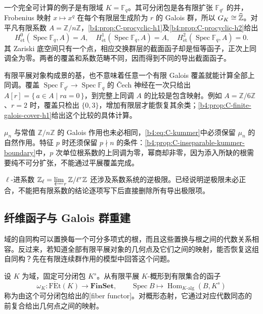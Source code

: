 一个完全可计算的例子是有限域 \(K=\mathbb F_q\)。其可分闭包是各有限扩张 \(\mathbb F_{q^r}\) 的并，Frobenius 映射 \(x\mapsto x^q\) 在每个有限层生成阶为 \(r\) 的 Galois 群，所以 \(G_K\cong\widehat{\vphantom{Z}\mathbb Z}\)。对平凡有限系数 \(A=\mathbb Z/n\mathbb Z\)，\cref{b4:prop:C-procyclic-h1}及\cref{b4:prop:C-procyclic-h2}给出
\[
	H^0_{\mathrm{\acute et}}(\operatorname{Spec}\mathbb F_q,A)=A, \quad H^1_{\mathrm{\acute et}}(\operatorname{Spec}\mathbb F_q,A)=A, \quad H^2_{\mathrm{\acute et}}(\operatorname{Spec}\mathbb F_q,A)=0.
\]
其 Zariski 底空间只有一个点，相应交换群层的截面函子却是恒等函子，正次上同调全为零。两者的覆盖和系数范畴不同，因而得到不同的导出截面函子。

\ProseParagraphBreak
有限平展对象构成景的基，也不意味着任意一个有限 Galois 覆盖就能计算全部上同调。覆盖 \(\operatorname{Spec}\mathbb F_{q^r}\to\operatorname{Spec}\mathbb F_q\) 的 Čech 神经在一次只给出 \(A[r]=\{\,a\in A\mid ra=0\,\}\)，到完整上同调 \(A\) 的比较是包含映射。例如 \(A=\mathbb Z/6\mathbb Z\)、\(r=2\) 时，覆盖只检出 \(\{0,3\}\)，增加有限层才能恢复其余类；\cref{b4:prop:C-finite-galois-cover-h1}给出这个比较的具体计算。

\ProseParagraphBreak
\(\mu_n\) 与常值 \(\mathbb Z/n\mathbb Z\) 的 Galois 作用也未必相同，\eqref{b4:eq:C-kummer}中必须保留 \(\mu_n\) 的自然作用。特征 \(p\) 时还须保留 \(p\nmid n\) 的条件：\cref{b4:prop:C-inseparable-kummer-boundary}中，\(p\) 次单位根系数的上同调为零，幂商却非零，因为添入所缺的根需要纯不可分扩张，不能通过平展覆盖完成。

\ProseParagraphBreak
\(\ell\)-进系数 \(\mathbb Z_\ell=\varprojlim_r\mathbb Z/\ell^r\mathbb Z\) 还涉及系数系统的逆极限。已经说明逆极限未必正合，不能把有限系数的结论逐项写下后直接删除所有导出极限项。

\subsection{纤维函子与 Galois 群重建}
\label{b4:subsec:C04:03}

域的自同构可以置换每一个可分多项式的根，而且这些置换与根之间的代数关系相容。反过来，若知道全部有限平展对象的几何点及它们之间的映射，能否恢复这组自同构？先在有限连续群作用的模型中回答这个问题。

\begin{definition}\label{b4:def:galois-fiber-functor}
	设 \(K\) 为域，固定可分闭包 \(K^s\)。从有限平展 \(K\)-概形到有限集合的函子
	\[
		\omega_K:\mathrm{F\acute Et}(K)\longrightarrow\mathbf{FinSet}, \qquad \operatorname{Spec}B\longmapsto \operatorname{Hom}_{K\text{-}\mathrm{alg}}(B,K^s)
	\]
	称为由这个可分闭包给出的[fiber functor]。对概形态射，它通过对应代数同态的前复合给出几何点之间的映射。
\end{definition}

